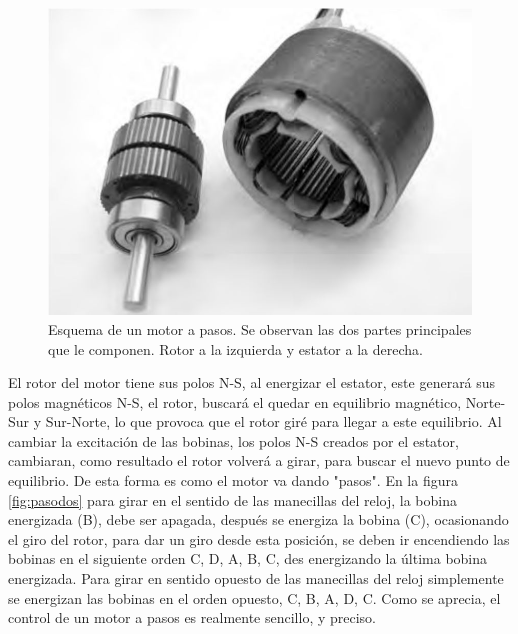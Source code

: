 \begin{figure}[h]
	\centering
	\includegraphics[width=0.7\linewidth]{Imagenes/2/RotorEstator}
	\caption{Esquema de un motor a pasos. Se observan las dos partes principales que le componen. Rotor a la izquierda y estator a la derecha. \cite{Acarnley2002}}
	\label{fig:rotorestator}
\end{figure}
El rotor del motor tiene sus polos N-S, al energizar el estator, este generará sus polos magnéticos N-S, el rotor, buscará el quedar en equilibrio magnético, Norte-Sur y Sur-Norte, lo que provoca que el rotor giré para llegar a este equilibrio. Al cambiar la excitación de las bobinas, los polos N-S creados por el estator, cambiaran, como resultado el rotor volverá a girar, para buscar el nuevo punto de equilibrio. De esta forma es como el motor va dando "pasos". En la figura \ref{fig:pasodos} para girar en el sentido de las manecillas del reloj, la bobina energizada (B), debe ser apagada, después se energiza la bobina (C), ocasionando el giro del rotor, para dar un giro desde esta posición, se deben ir encendiendo las bobinas en el siguiente orden C, D, A, B, C, des energizando la última bobina energizada. Para girar en sentido opuesto de las manecillas del reloj simplemente se energizan las bobinas en el orden opuesto, C, B, A, D, C.
Como se aprecia, el control de un motor a pasos es realmente sencillo, y preciso. 
